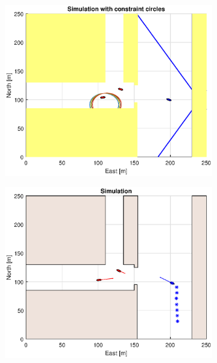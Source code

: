 \begin{figure}[ht]\ContinuedFloat
    \begin{subfigure}[b]{0.49\textwidth}
        \centering
        \includegraphics[width=\textwidth]{Images/Figures/Havn1/Simple1_f1_Frame5}
    \end{subfigure}
    \hfill
    \begin{subfigure}[b]{0.499\textwidth}
        \centering
        \includegraphics[width=\textwidth]{Images/Figures/Havn1/Simple1_f600_Frame5}
    \end{subfigure}

\end{figure}
